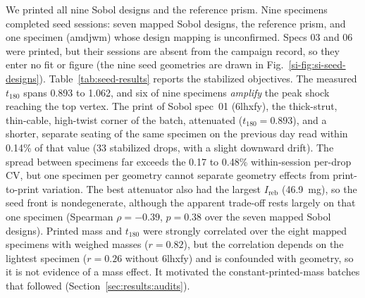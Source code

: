 \documentclass[lineno,nocopyright,upint,varvw,hyphenate]{asmejour}
\newcommand{\siref}[1]{\ref*{si-#1}}
\begin{document}
We printed all nine Sobol designs and the reference prism. Nine
specimens completed seed sessions: seven mapped Sobol designs, the
reference prism, and one specimen (amdjwm) whose design mapping is
unconfirmed. Specs 03 and 06 were printed, but their sessions are
absent from the campaign record, so they enter no fit or figure (the
nine seed geometries are drawn in Fig.~\siref{fig:si-seed-designs}).
Table~\ref{tab:seed-results} reports the stabilized objectives. The
measured $t_{180}$ spans 0.893 to 1.062, and six of nine specimens
\emph{amplify} the peak shock reaching the top vertex. The print of
Sobol spec~01 (6lhxfy), the thick-strut, thin-cable, high-twist corner
of the batch, attenuated ($t_{180} = 0.893$), and a shorter, separate
seating of the same specimen on the previous day read within 0.14\% of
that value (33 stabilized drops, with a slight downward drift). The
spread between
specimens far exceeds the 0.17 to 0.48\% within-session per-drop CV,
but one specimen per geometry cannot separate geometry effects from
print-to-print variation. The best attenuator also had the largest
$I_{\mathrm{reb}}$ (\SI{46.9}{mg}), so the seed front is nondegenerate,
although the apparent trade-off rests largely on that one specimen
(Spearman $\rho = -0.39$, $p = 0.38$ over the seven mapped Sobol
designs). Printed mass and $t_{180}$ were strongly correlated over the
eight mapped specimens with weighed masses ($r = 0.82$), but the
correlation depends on the lightest specimen ($r = 0.26$ without
6lhxfy) and is confounded with geometry, so it is not evidence of a
mass effect. It motivated the constant-printed-mass batches that
followed (Section~\ref{sec:results:audits}).
\end{document}
